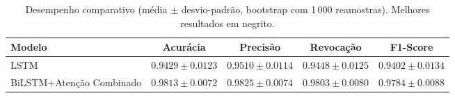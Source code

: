 \begin{table}[ht]
\centering
\caption{Desempenho comparativo (média $\pm$ desvio-padrão, bootstrap com 1\,000 reamostras). Melhores resultados em negrito.}
\label{tab:resultados}
\begin{tabular}{lcccc}
\hline
\textbf{Modelo} & \textbf{Acurácia} & \textbf{Precisão} & \textbf{Revocação} & \textbf{F1-Score} \\
\hline
LSTM & $0.9429 \pm 0.0123$ & $0.9510 \pm 0.0114$ & $0.9448 \pm 0.0125$ & $0.9402 \pm 0.0134$ \\
BiLSTM+Atenção Combinado & \textbf{$0.9813 \pm 0.0072$} & \textbf{$0.9825 \pm 0.0074$} & \textbf{$0.9803 \pm 0.0080$} & \textbf{$0.9784 \pm 0.0088$} \\
\hline
\end{tabular}
\end{table}
